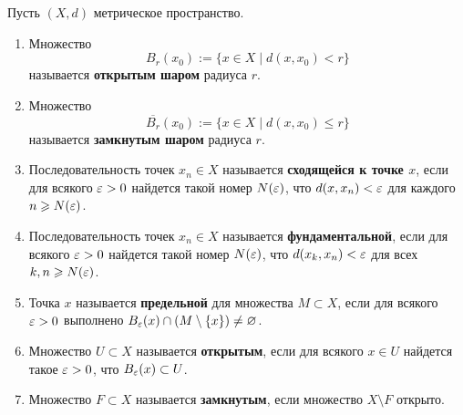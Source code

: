 \documentclass[a4paper]{article}
\theoremstyle{named}
\begin{document}
        \begin{definition*}
            Пусть $(X, d)$ метрическое пространство.
            \begin{enumerate}
            \item
                Множество 
                \begin{equation*}
                    B_r(x_0) := \{x \in X \mid d(x, x_0) < r\}
                \end{equation*}
                называется \textbf{открытым шаром} радиуса $r$.

            \item
                Множество
                \begin{equation*}
                    \overline{B_r}(x_0) := \{x \in X \mid d(x, x_0) \leq r\}
                \end{equation*}
                называется \textbf{замкнутым шаром} радиуса $r$.

            \item
                Последовательность точек $x_n \in X$ называется \textbf{сходящейся к точке $x$}, если для всякого $\varepsilon > 0$ найдется такой номер $N(\varepsilon)$, что $d(x, x_n) < \varepsilon$ для каждого $n \geqslant N(\varepsilon)$.

            \item
                Последовательность точек $x_n \in X$ называется \textbf{фундаментальной}, если для всякого $\varepsilon > 0$ найдется такой номер $N(\varepsilon)$, что $d(x_k, x_n) < \varepsilon$ для всех $k, n \geqslant N(\varepsilon)$.

            \item
                Точка $x$ называется \textbf{предельной} для множества $M \subset X$, если для всякого $\varepsilon > 0$ выполнено $B_{\varepsilon}(x) \cap (M \setminus \{x\}) \neq \varnothing$.

            \item
                Множество $U \subset X$ называется \textbf{открытым}, если для всякого $x \in U$ найдется такое $\varepsilon > 0$, что $B_{\varepsilon}(x) \subset U$.

            \item
                Множество $F \subset X$ называется \textbf{замкнутым}, если множество $X \setminus F$ открыто.
            \end{enumerate}
        \end{definition*}   
\end{document}
